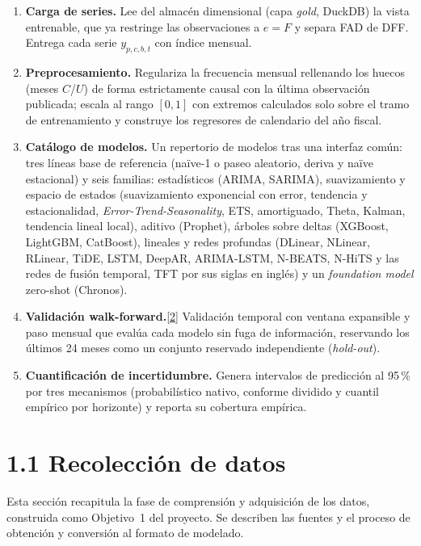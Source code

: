\documentclass[12pt,letterpaper]{report}
\newcommand{\cita}[1]{\hyperref[bib:#1]{[#1]}}
\begin{document}
\begin{enumerate}[leftmargin=*]
\item \textbf{Carga de series.} Lee del almacén dimensional (capa \textit{gold},
DuckDB) la vista entrenable, que ya restringe las observaciones a $e=F$ y separa
FAD de DFF. Entrega cada serie $y_{p,c,b,t}$ con índice mensual.
\item \textbf{Preprocesamiento.} Regulariza la frecuencia mensual rellenando los
huecos (meses $C$/$U$) de forma estrictamente causal con la última observación
publicada; escala al rango $[0,1]$ con extremos calculados solo sobre el tramo de
entrenamiento y construye los regresores de calendario del año fiscal.
\item \textbf{Catálogo de modelos.} Un repertorio de \factNModels{} modelos tras una interfaz común: tres
líneas base de referencia (naïve-1 o paseo aleatorio, deriva y naïve estacional) y seis
familias: estadísticos (ARIMA, SARIMA), suavizamiento y espacio de estados (suavizamiento exponencial con error, tendencia y
estacionalidad, \textit{Error-Trend-Seasonality}, ETS, amortiguado, Theta, Kalman, tendencia lineal local), aditivo (Prophet), árboles sobre
deltas (XGBoost, LightGBM, CatBoost), lineales y redes profundas (DLinear, NLinear,
RLinear, TiDE, LSTM, DeepAR, ARIMA-LSTM, N-BEATS, N-HiTS y las redes de fusión temporal, TFT por sus
siglas en inglés) y un \textit{foundation
model} zero-shot (Chronos).
\item \textbf{Validación walk-forward.}\cita{2} Validación temporal con ventana
expansible y paso mensual que evalúa cada modelo sin fuga de información, reservando
los últimos 24 meses como un conjunto reservado independiente (\textit{hold-out}).
\item \textbf{Cuantificación de incertidumbre.} Genera intervalos de predicción al
95\,\% por tres mecanismos (probabilístico nativo, conforme dividido y cuantil empírico por
horizonte) y reporta su
cobertura empírica.
\end{enumerate}


\section{1.1 Recolección de datos}

Esta sección recapitula la fase de comprensión y adquisición de los datos,
construida como Objetivo~1 del proyecto. Se describen las fuentes y el proceso de
obtención y conversión al formato de modelado.
\end{document}
